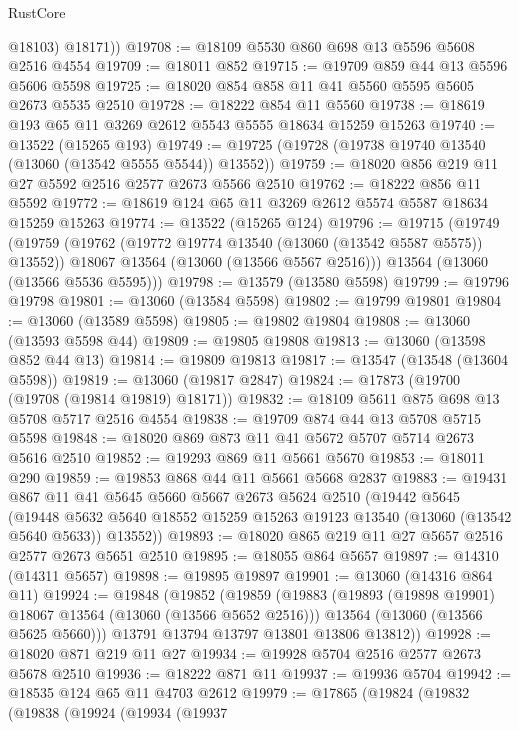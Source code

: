 \begin{lexlean}{RustCore}
\begin{coremodule}
          @18103)
        @18171))
@19708 := @18109 @5530 @860 @698 @13 @5596 @5608 @2516 @4554
@19709 := @18011 @852
@19715 := @19709 @859 @44 @13 @5596 @5606 @5598
@19725 := @18020 @854 @858 @11 @41 @5560 @5595 @5605 @2673 @5535 @2510
@19728 := @18222 @854 @11 @5560
@19738 := @18619 @193 @65 @11 @3269 @2612 @5543 @5555 @18634 @15259 @15263
@19740 := @13522 (@15265 @193)
@19749 := @19725 (@19728 (@19738 @19740 @13540 (@13060 (@13542 @5555 @5544)) @13552))
@19759 := @18020 @856 @219 @11 @27 @5592 @2516 @2577 @2673 @5566 @2510
@19762 := @18222 @856 @11 @5592
@19772 := @18619 @124 @65 @11 @3269 @2612 @5574 @5587 @18634 @15259 @15263
@19774 := @13522 (@15265 @124)
@19796 := @19715
    (@19749
      (@19759
        (@19762 (@19772 @19774 @13540 (@13060 (@13542 @5587 @5575)) @13552))
        @18067
        @13564
        (@13060 (@13566 @5567 @2516)))
      @13564
      (@13060 (@13566 @5536 @5595)))
@19798 := @13579 (@13580 @5598)
@19799 := @19796 @19798
@19801 := @13060 (@13584 @5598)
@19802 := @19799 @19801
@19804 := @13060 (@13589 @5598)
@19805 := @19802 @19804
@19808 := @13060 (@13593 @5598 @44)
@19809 := @19805 @19808
@19813 := @13060 (@13598 @852 @44 @13)
@19814 := @19809 @19813
@19817 := @13547 (@13548 (@13604 @5598))
@19819 := @13060 (@19817 @2847)
@19824 := @17873 (@19700 (@19708 (@19814 @19819) @18171))
@19832 := @18109 @5611 @875 @698 @13 @5708 @5717 @2516 @4554
@19838 := @19709 @874 @44 @13 @5708 @5715 @5598
@19848 := @18020 @869 @873 @11 @41 @5672 @5707 @5714 @2673 @5616 @2510
@19852 := @19293 @869 @11 @5661 @5670
@19853 := @18011 @290
@19859 := @19853 @868 @44 @11 @5661 @5668 @2837
@19883 := @19431
    @867
    @11
    @41
    @5645
    @5660
    @5667
    @2673
    @5624
    @2510
    (@19442
      @5645
      (@19448 @5632 @5640 @18552 @15259 @15263 @19123 @13540 (@13060 (@13542 @5640 @5633)) @13552))
@19893 := @18020 @865 @219 @11 @27 @5657 @2516 @2577 @2673 @5651 @2510
@19895 := @18055 @864 @5657
@19897 := @14310 (@14311 @5657)
@19898 := @19895 @19897
@19901 := @13060 (@14316 @864 @11)
@19924 := @19848
    (@19852
      (@19859
        (@19883
          (@19893 (@19898 @19901) @18067 @13564 (@13060 (@13566 @5652 @2516)))
          @13564
          (@13060 (@13566 @5625 @5660)))
        @13791
        @13794
        @13797
        @13801
        @13806
        @13812))
@19928 := @18020 @871 @219 @11 @27
@19934 := @19928 @5704 @2516 @2577 @2673 @5678 @2510
@19936 := @18222 @871 @11
@19937 := @19936 @5704
@19942 := @18535 @124 @65 @11 @4703 @2612
@19979 := @17865
    (@19824
      (@19832
        (@19838
          (@19924
            (@19934
              (@19937

\end{coremodule}
\end{lexlean}
